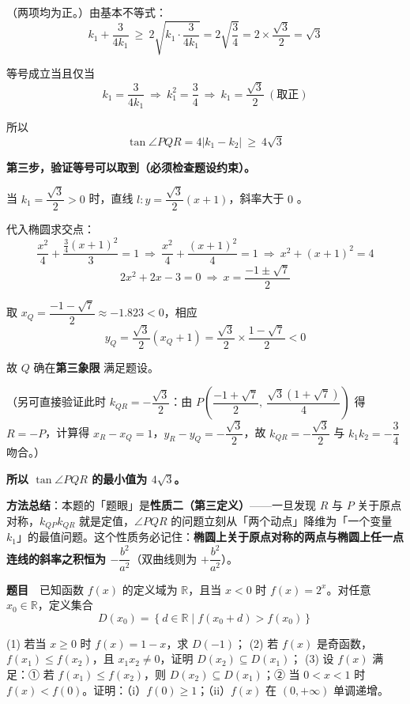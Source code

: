 （两项均为正。）由基本不等式：
\[k_1+\frac{3}{4k_1}\ \ge\ 2\sqrt{k_1\cdot\frac{3}{4k_1}}=2\sqrt{\frac34}=2\times\frac{\sqrt3}{2}=\sqrt3\]

等号成立当且仅当
\[k_1=\frac{3}{4k_1}\ \Longrightarrow\ k_1^2=\frac34\ \Longrightarrow\ k_1=\frac{\sqrt3}{2}\ (\text{取正})\]

所以
\[\tan\angle PQR=4\left|k_1-k_2\right|\ \ge\ 4\sqrt3\]

\textbf{第三步，验证等号可以取到（必须检查题设约束）。}

当 $k_1=\dfrac{\sqrt3}{2}>0$ 时，直线 $l:y=\dfrac{\sqrt3}{2}(x+1)$，斜率大于 $0$ 。

代入椭圆求交点：
\[\frac{x^2}{4}+\frac{\frac34(x+1)^2}{3}=1\ \Longrightarrow\ \frac{x^2}{4}+\frac{(x+1)^2}{4}=1\ \Longrightarrow\ x^2+(x+1)^2=4\]
\[2x^2+2x-3=0\ \Longrightarrow\ x=\frac{-1\pm\sqrt7}{2}\]

取 $x_Q=\dfrac{-1-\sqrt7}{2}\approx-1.823<0$，相应
\[y_Q=\frac{\sqrt3}{2}\left(x_Q+1\right)=\frac{\sqrt3}{2}\times\frac{1-\sqrt7}{2}<0\]

故 $Q$ 确在\textbf{第三象限}  满足题设。

（另可直接验证此时 $k_{QR}=-\dfrac{\sqrt3}{2}$：由 $P\left(\dfrac{-1+\sqrt7}{2},\ \dfrac{\sqrt3(1+\sqrt7)}{4}\right)$ 得 $R=-P$，计算得 $x_R-x_Q=1$，$y_R-y_Q=-\dfrac{\sqrt3}{2}$，故 $k_{QR}=-\dfrac{\sqrt3}{2}$  与 $k_1k_2=-\dfrac34$ 吻合。）

\textbf{所以 $\tan\angle PQR$ 的最小值为 $4\sqrt3$。}

\begin{gktip}
\textbf{方法总结}：本题的「题眼」是\textbf{性质二（第三定义）}——一旦发现 $R$ 与 $P$ 关于原点对称，$k_{QP}k_{QR}$ 就是定值，$\angle PQR$ 的问题立刻从「两个动点」降维为「一个变量 $k_1$」的最值问题。这个性质务必记住：\textbf{椭圆上关于原点对称的两点与椭圆上任一点连线的斜率之积恒为 $-\dfrac{b^2}{a^2}$}（双曲线则为 $+\dfrac{b^2}{a^2}$）。
\end{gktip}

\par\medskip


\textbf{题目}　已知函数 $f(x)$ 的定义域为 $\mathbb{R}$，且当 $x<0$ 时 $f(x)=2^{x}$。对任意 $x_0\in\mathbb{R}$，定义集合
\[D(x_0)=\left\{d\in\mathbb{R}\mid f(x_0+d)>f(x_0)\right\}\]

  (1) 若当 $x\ge0$ 时 $f(x)=1-x$，求 $D(-1)$；
  (2) 若 $f(x)$ 是奇函数，$f(x_1)\le f(x_2)$，且 $x_1x_2\ne0$，证明 $D(x_2)\subseteq D(x_1)$；
  (3) 设 $f(x)$ 满足：① 若 $f(x_1)\le f(x_2)$，则 $D(x_2)\subseteq D(x_1)$；② 当 $0<x<1$ 时 $f(x)<f(0)$。证明：（i）$f(0)\ge1$；（ii）$f(x)$ 在 $(0,+\infty)$ 单调递增。

